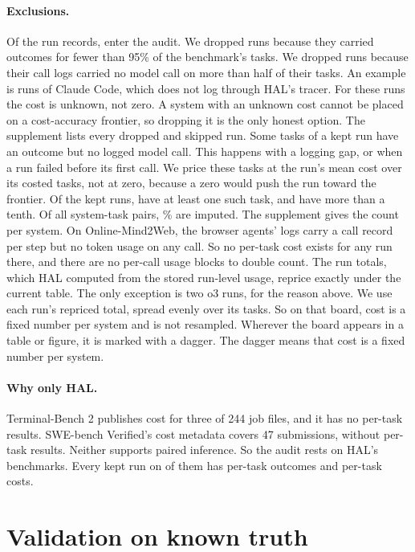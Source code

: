 \documentclass[11pt]{article}
\begin{document}
\paragraph{Exclusions.}
Of the \NumHalRunsRead{} run records, \NumHalRunsKept{} enter the audit. We dropped \NumHalDroppedCoverage{} runs because they carried outcomes for fewer than 95\% of the benchmark's tasks. We dropped \NumHalDroppedNoCalls{} runs because their call logs carried no model call on more than half of their tasks. An example is runs of Claude Code, which does not log through HAL's tracer. For these runs the cost is unknown, not zero. A system with an unknown cost cannot be placed on a cost-accuracy frontier, so dropping it is the only honest option. The supplement lists every dropped and skipped run. Some tasks of a kept run have an outcome but no logged model call. This happens with a logging gap, or when a run failed before its first call. We price these tasks at the run's mean cost over its costed tasks, not at zero, because a zero would push the run toward the frontier. Of the kept runs, \NumHalSystemsUncosted{} have at least one such task, and \NumHalSystemsUncostedOverTenPct{} have more than a tenth. Of all system-task pairs, \NumHalUncostedTasksPct\% are imputed. The supplement gives the count per system. On Online-Mind2Web, the browser agents' logs carry a call record per step but no token usage on any call. So no per-task cost exists for any run there, and there are no per-call usage blocks to double count. The run totals, which HAL computed from the stored run-level usage, reprice exactly under the current table. The only exception is two o3 runs, for the reason above. We use each run's repriced total, spread evenly over its tasks. So on that board, cost is a fixed number per system and is not resampled. Wherever the board appears in a table or figure, it is marked with a dagger. The dagger means that cost is a fixed number per system.

\paragraph{Why only HAL.}
Terminal-Bench 2 publishes cost for three of 244 job files, and it has no per-task results. SWE-bench Verified's cost metadata covers 47 submissions, without per-task results. Neither supports paired inference. So the audit rests on HAL's \NumHalBoards{} benchmarks. Every kept run on \NumHalBoardsPerTask{} of them has per-task outcomes and per-task costs.


\section{Validation on known truth}
\label{sec:validation}
\end{document}
